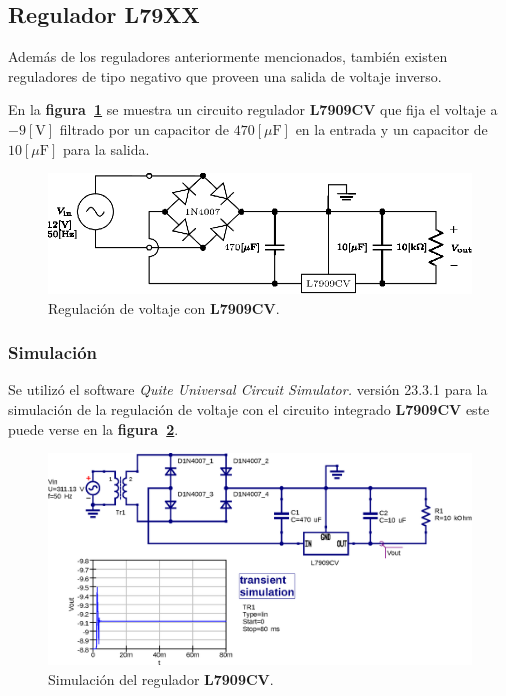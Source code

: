 \subsection{Regulador L79XX}
Además de los reguladores anteriormente mencionados, también existen reguladores
de tipo negativo que proveen una salida de voltaje inverso.

En la \textbf{figura~\ref{circuito10}} se muestra un circuito regulador
\textbf{L7909CV} que fija el voltaje a $-9[\text{V}]$ filtrado por un capacitor
de $470[\mu\text{F}]$ en la entrada y un capacitor de $10[\mu\text{F}]$ para la
salida.

\begin{figure}[!h]
\centering
\includegraphics[scale=1.1]{diagramas/10.regulador2.eps}
\caption{Regulación de voltaje con \textbf{L7909CV}.}
\label{circuito10}
\end{figure}

\subsubsection{Simulación}
Se utilizó el software \emph{Quite Universal Circuit Simulator.} versión 23.3.1
para la simulación de la regulación de voltaje con el circuito integrado
\textbf{L7909CV} este puede verse en la \textbf{figura~\ref{simulacion10}}.

\begin{figure}[!h]
\centering
\includegraphics[scale=0.75]{simulacion/10.regulador2.eps}
\caption{Simulación del regulador \textbf{L7909CV}.}
\label{simulacion10}
\end{figure}

